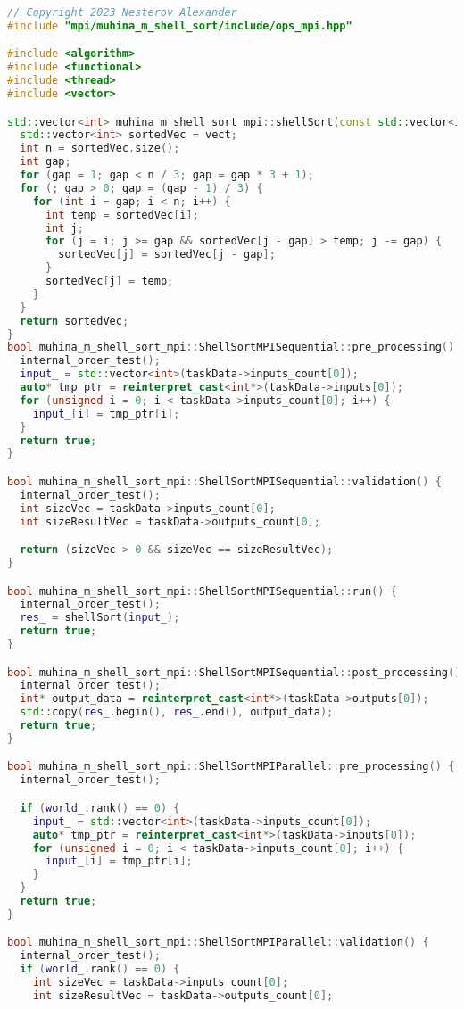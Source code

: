 \documentclass[12pt]{article}
\begin{document}
\begin{lstlisting}[language=C++]
// Copyright 2023 Nesterov Alexander
#include "mpi/muhina_m_shell_sort/include/ops_mpi.hpp"

#include <algorithm>
#include <functional>
#include <thread>
#include <vector>

std::vector<int> muhina_m_shell_sort_mpi::shellSort(const std::vector<int>& vect) {
  std::vector<int> sortedVec = vect;
  int n = sortedVec.size();
  int gap;
  for (gap = 1; gap < n / 3; gap = gap * 3 + 1);
  for (; gap > 0; gap = (gap - 1) / 3) {
    for (int i = gap; i < n; i++) {
      int temp = sortedVec[i];
      int j;
      for (j = i; j >= gap && sortedVec[j - gap] > temp; j -= gap) {
        sortedVec[j] = sortedVec[j - gap];
      }
      sortedVec[j] = temp;
    }
  }
  return sortedVec;
}
bool muhina_m_shell_sort_mpi::ShellSortMPISequential::pre_processing() {
  internal_order_test();
  input_ = std::vector<int>(taskData->inputs_count[0]);
  auto* tmp_ptr = reinterpret_cast<int*>(taskData->inputs[0]);
  for (unsigned i = 0; i < taskData->inputs_count[0]; i++) {
    input_[i] = tmp_ptr[i];
  }
  return true;
}

bool muhina_m_shell_sort_mpi::ShellSortMPISequential::validation() {
  internal_order_test();
  int sizeVec = taskData->inputs_count[0];
  int sizeResultVec = taskData->outputs_count[0];

  return (sizeVec > 0 && sizeVec == sizeResultVec);
}

bool muhina_m_shell_sort_mpi::ShellSortMPISequential::run() {
  internal_order_test();
  res_ = shellSort(input_);
  return true;
}

bool muhina_m_shell_sort_mpi::ShellSortMPISequential::post_processing() {
  internal_order_test();
  int* output_data = reinterpret_cast<int*>(taskData->outputs[0]);
  std::copy(res_.begin(), res_.end(), output_data);
  return true;
}

bool muhina_m_shell_sort_mpi::ShellSortMPIParallel::pre_processing() {
  internal_order_test();

  if (world_.rank() == 0) {
    input_ = std::vector<int>(taskData->inputs_count[0]);
    auto* tmp_ptr = reinterpret_cast<int*>(taskData->inputs[0]);
    for (unsigned i = 0; i < taskData->inputs_count[0]; i++) {
      input_[i] = tmp_ptr[i];
    }
  }
  return true;
}

bool muhina_m_shell_sort_mpi::ShellSortMPIParallel::validation() {
  internal_order_test();
  if (world_.rank() == 0) {
    int sizeVec = taskData->inputs_count[0];
    int sizeResultVec = taskData->outputs_count[0];


\end{lstlisting}
\end{document}
